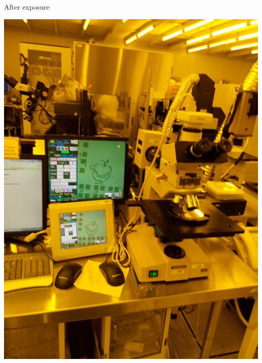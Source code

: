 \documentclass[aspectratio=169]{beamer}
\begin{document}
\begin{frame}{After exposure}
\begin{center}
\includegraphics[height=0.8\textheight]{images/20181210_125845.jpg}
\end{center}
\end{frame}
\end{document}
